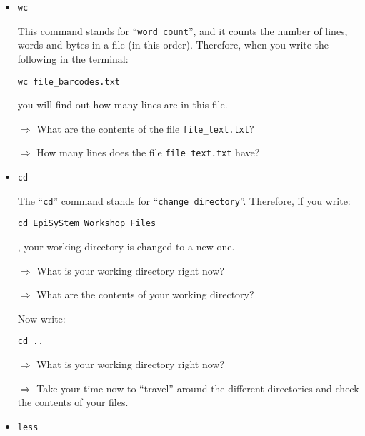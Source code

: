 \documentclass[11pt]{article}
\begin{document}
\begin{itemize}
\item \texttt{wc}

This command stands for ``\texttt{word count}'', and it counts the number of lines, words and bytes in a file (in this order). Therefore, when you write the following in the terminal:
\begin{verbatim}
wc file_barcodes.txt
\end{verbatim}
you will find out how many lines are in this file. 

\vspace{1em}
\hrulefill

$\Rightarrow$ What are the contents of the file \texttt{file\_text.txt}?

$\Rightarrow$ How many lines does the file \texttt{file\_text.txt} have?

\hrulefill
\vspace{1em}

\item \texttt{cd}

The ``\texttt{cd}'' command stands for ``\texttt{change directory}''. Therefore, if you write:

\begin{verbatim}
cd EpiSyStem_Workshop_Files
\end{verbatim}

, your working directory is changed to a new one. 

\vspace{1em}
\hrulefill

$\Rightarrow$ What is your working directory right now?

$\Rightarrow$ What are the contents of your working directory?

\hrulefill
\vspace{1em}

Now write:

\begin{verbatim}
cd ..
\end{verbatim}

\vspace{1em}
\hrulefill

$\Rightarrow$ What is your working directory right now?

$\Rightarrow$ Take your time now to ``travel'' around the different directories and check the contents of your files. 

\hrulefill
\vspace{1em}

\item \texttt{less}


\end{itemize}
\end{document}

